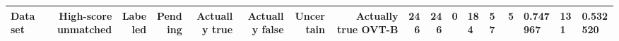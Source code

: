 \begin{tabular}{lrrrrrrrrr}
\toprule
Dataset & High-score unmatched & Labeled & Pending & Actually true & Actually false & Uncertain & Actually true %
\midrule
OVT-B & 246 & 246 & 0 & 184 & 57 & 5 & 0.747967 & 131 & 0.532520 \\
\bottomrule
\end{tabular}
